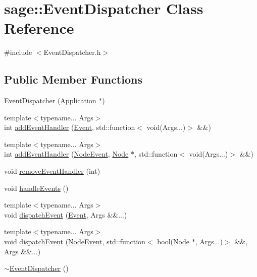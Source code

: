 \hypertarget{classsage_1_1EventDispatcher}{}\section{sage\+::Event\+Dispatcher Class Reference}
\label{classsage_1_1EventDispatcher}


{\ttfamily \#include $<$Event\+Dispatcher.\+h$>$}

\subsection*{Public Member Functions}
\begin{DoxyCompactItemize}
\item 
\mbox{\hyperlink{classsage_1_1EventDispatcher_a6af3114e66a9f42aa03e13058d63dd62}{Event\+Dispatcher}} (\mbox{\hyperlink{classsage_1_1Application}{Application}} $\ast$)
\item 
{\footnotesize template$<$typename... Args$>$ }\\int \mbox{\hyperlink{classsage_1_1EventDispatcher_a871869f2a078e81c20a220a633d4e471}{add\+Event\+Handler}} (\mbox{\hyperlink{namespacesage_afe706a25026cc74fe69b56d53a265d29}{Event}}, std\+::function$<$ void(Args...)$>$ \&\&)
\item 
{\footnotesize template$<$typename... Args$>$ }\\int \mbox{\hyperlink{classsage_1_1EventDispatcher_ae913c37fa0b821da626ecd4adfd16435}{add\+Event\+Handler}} (\mbox{\hyperlink{namespacesage_ad2c7b0e1ebf67f572d43620e6b07aa13}{Node\+Event}}, \mbox{\hyperlink{classsage_1_1Node}{Node}} $\ast$, std\+::function$<$ void(Args...)$>$ \&\&)
\item 
void \mbox{\hyperlink{classsage_1_1EventDispatcher_a79f655113b28c14ee6a86fa5ed7ec238}{remove\+Event\+Handler}} (int)
\item 
void \mbox{\hyperlink{classsage_1_1EventDispatcher_af94b0101f87f16334c1d32ea7a43c02a}{handle\+Events}} ()
\item 
{\footnotesize template$<$typename... Args$>$ }\\void \mbox{\hyperlink{classsage_1_1EventDispatcher_a096c6d68c684bb49ec1f8055c0e2a2d9}{dispatch\+Event}} (\mbox{\hyperlink{namespacesage_afe706a25026cc74fe69b56d53a265d29}{Event}}, Args \&\&...)
\item 
{\footnotesize template$<$typename... Args$>$ }\\void \mbox{\hyperlink{classsage_1_1EventDispatcher_a508e38af7b9f87888fd9f37efecbb760}{dispatch\+Event}} (\mbox{\hyperlink{namespacesage_ad2c7b0e1ebf67f572d43620e6b07aa13}{Node\+Event}}, std\+::function$<$ bool(\mbox{\hyperlink{classsage_1_1Node}{Node}} $\ast$, Args...)$>$ \&\&, Args \&\&...)
\item 
\mbox{\hyperlink{classsage_1_1EventDispatcher_abb5f401014e87f03027d6c4450964e55}{$\sim$\+Event\+Dispatcher}} ()
\end{DoxyCompactItemize}
